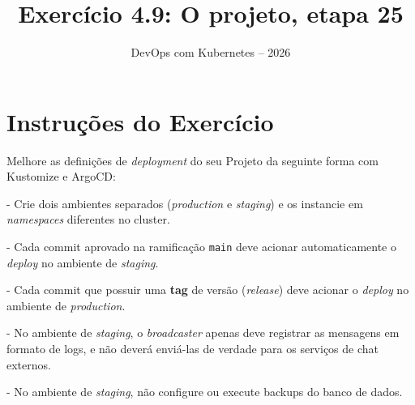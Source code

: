 \documentclass[11pt,a4paper]{article}
\title{\color{secondary}\Huge\textbf{Exercício 4.9: O projeto, etapa 25}}
\author{\color{primary}DevOps com Kubernetes -- 2026}
\date{}
\begin{document}
\maketitle

\section*{\color{primary}Instruções do Exercício}
\begin{tcolorbox}[colback=blue!5!white,colframe=blue!75!black,title=Exercício 4.9: O projeto, etapa 25]
Melhore as definições de \textit{deployment} do seu Projeto da seguinte forma com Kustomize e ArgoCD:

- Crie dois ambientes separados (\textit{production} e \textit{staging}) e os instancie em \textit{namespaces} diferentes no cluster.

- Cada commit aprovado na ramificação \texttt{main} deve acionar automaticamente o \textit{deploy} no ambiente de \textit{staging}.

- Cada commit que possuir uma \textbf{tag} de versão (\textit{release}) deve acionar o \textit{deploy} no ambiente de \textit{production}.

- No ambiente de \textit{staging}, o \textit{broadcaster} apenas deve registrar as mensagens em formato de logs, e não deverá enviá-las de verdade para os serviços de chat externos.

- No ambiente de \textit{staging}, não configure ou execute backups do banco de dados.
\end{tcolorbox}
\end{document}

